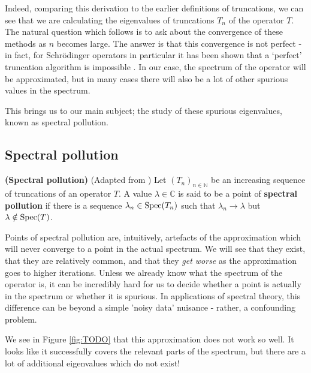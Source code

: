 \documentclass[../main.tex]{subfiles}
\begin{document}
Indeed, comparing this derivation to the earlier definitions of truncations, we
can see that we are calculating the eigenvalues of truncations $T_n$ of the
operator $T$. The natural question which follows is to ask about the convergence
of these methods as $n$ becomes large. The answer is that this
convergence is not perfect - in fact,  for Schr\"odinger operators in particular
it has been shown that a `perfect' truncation algorithm is impossible
\cite{colbrook2019how}. In our case, the spectrum of the operator will be
approximated, but in many cases there will also be a lot of other spurious
values in the spectrum.

This brings us to our main subject; the study of these spurious eigenvalues, known as spectral pollution.

\subsection{Spectral pollution}

\begin{definition}{\textbf{(Spectral pollution)}}
(Adapted from \parencite{davies1995spectral})
Let $(T_n)_{n \in \mathbb{N}}$ be an increasing sequence of truncations of an
operator $T$. A value $\lambda \in \mathbb{C}$ is said to be a point of
\textbf{spectral pollution} if there is a sequence $\lambda_n \in \mathrm{Spec}(T_n)$
such that $\lambda_n \rightarrow \lambda$ but $\lambda \notin \mathrm{Spec}(T)$.
\end{definition}

Points of spectral pollution are, intuitively, artefacts of the approximation
which will never converge to a point in the actual spectrum. We will see that
they exist, that they are relatively common, and that they \emph{get worse} as
the approximation goes to higher iterations. Unless we already know what the
spectrum of the operator is, it can be incredibly hard for us to decide whether
a point is actually in the spectrum or whether it is
spurious. In applications of spectral theory, this difference can be beyond a
simple 'noisy data' nuisance - rather, a confounding problem.

\begin{example}
\end{example}

We see in Figure \ref{fig:TODO} that this approximation does not work so well.
It looks like it successfully covers the relevant parts of the spectrum, but
there are a lot of additional eigenvalues which do not exist!
\end{document}
